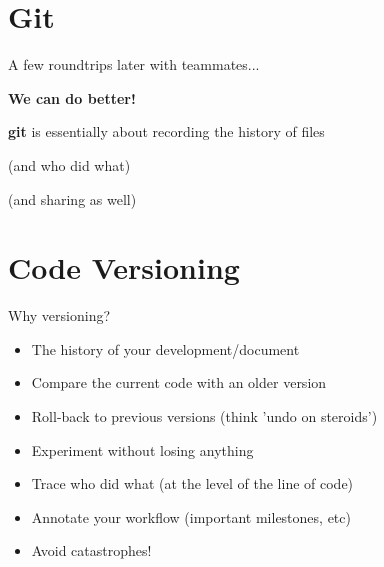 \documentclass[compress]{beamer}
\makeatletter
\let\beamer@writeslidentry@miniframeson=\beamer@writeslidentry
\newcommand*{\miniframeson}{\let\beamer@writeslidentry=\beamer@writeslidentry@miniframeson}
\makeatother
\begin{document}
\section{Git}



\begin{frame}[plain]
    A few roundtrips later with teammates...
\end{frame}


{
    \begin{frame}[plain]{}
    \end{frame}
}


\begin{frame}{}
    \begin{center}
        \textbf{We can do better!}
    \end{center}
    \pause

    \textbf{git} is essentially about recording the history of files
    \pause

    (and who did what)
    \pause

    (and sharing as well)
\end{frame}

\miniframeson
\section{Code Versioning}

\begin{frame}{Why versioning?}

    \begin{itemize}
        \item The history of your development/document
        \item Compare the current code with an older version
        \item Roll-back to previous versions (think 'undo on steroids')
        \item Experiment without losing anything
        \item Trace who did what (at the level of the line of code)
        \item Annotate your workflow (important milestones, etc)
        \item Avoid catastrophes!
    \end{itemize}
\end{frame}
\end{document}
